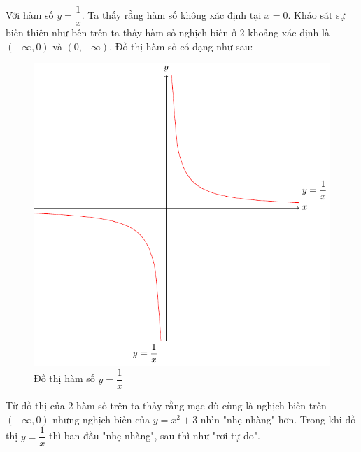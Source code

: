\begin{example}
    Với hàm số $y = \dfrac{1}{x}$. Ta thấy rằng hàm số không xác
    định tại $x=0$. Khảo sát sự biến thiên như bên trên ta thấy
    hàm số nghịch biến ở 2 khoảng xác định là $(-\infty, 0)$
    và $(0, +\infty)$. Đồ thị hàm số có dạng như sau:
    \begin{figure}[ht]
        \centering
        \includegraphics[scale=0.75]{pics/algebra/algebra3.pdf}
        \caption{Đồ thị hàm số $y = \dfrac{1}{x}$}
    \end{figure}
\end{example}

Từ đồ thị của 2 hàm số trên ta thấy rằng mặc dù cùng là nghịch biến
trên $(-\infty, 0)$ nhưng nghịch biến của $y=x^2+3$ nhìn "nhẹ nhàng" hơn. Trong khi 
đồ thị $y = \dfrac{1}{x}$ thì ban đầu "nhẹ nhàng", sau thì như
"rơi tự do".